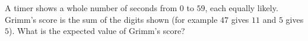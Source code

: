 A timer shows a whole number of seconds from $0$ to $59$, each equally likely. Grimm's score is the sum of the digits shown (for example $47$ gives $11$ and $5$ gives $5$). What is the expected value of Grimm's score?

